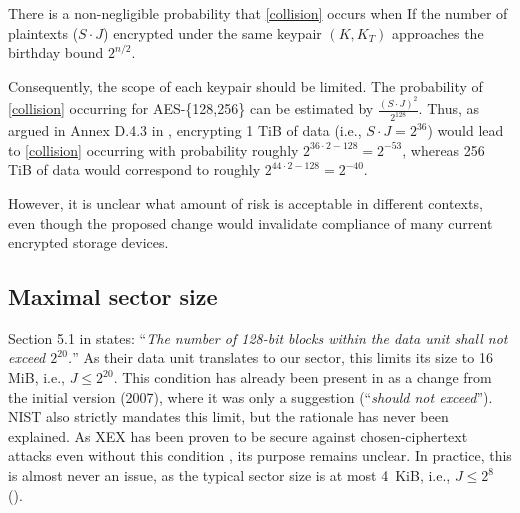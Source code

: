 \documentclass[a4paper]{article}
\begin{document}
There is a non-negligible probability that \eqref{collision} occurs when 
If the number of plaintexts ($S\cdot J$) encrypted under the same keypair $(K, K_T)$ approaches the birthday bound $2^{n/2}$.

Consequently, the scope of each keypair should be limited. The probability of \eqref{collision} occurring for AES-\{128,256\} can be estimated by $\frac{(S\cdot J)^2}{2^{128}}$. Thus, as argued in Annex D.4.3 in \cite{IEEE1619-2018}, encrypting 1 TiB of data (i.e., $S\cdot J=2^{36}$) would lead to \eqref{collision} occurring with probability roughly $2^{36\cdot 2-128}=2^{-53}$, whereas 256 TiB of data would correspond to roughly $2^{44\cdot 2-128}=2^{-40}$.

However, it is unclear what amount of risk is acceptable in different contexts, even though the proposed change would invalidate compliance of many current 
encrypted storage devices.

\subsection{Maximal sector size}
Section 5.1 in \cite{IEEE1619-2018} states: ``\emph{The number of 128-bit blocks within the data unit shall not exceed $2^{20}$.}'' As their data unit translates to our sector, this limits its size to 16 MiB, i.e., $J \le 2^{20}$. This condition has already been present in \cite{IEEE1619-2018} as a change from the initial version (2007), where it was only a suggestion (``\emph{should not exceed}''). NIST \cite{nistxts} also strictly mandates this limit, but the rationale has never been explained. As XEX has been proven to be secure against chosen-ciphertext attacks even without this condition \cite{rogaway2004efficient, minematsu2006improved}, its purpose remains unclear.
In practice, this is almost never an issue, as the typical sector size is at most 4~KiB, i.e., $J \le 2^8$ ().
\end{document}
